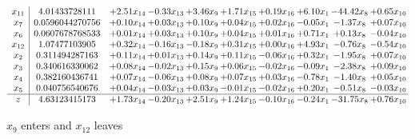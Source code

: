 \documentclass[9pt]{article}
\begin{document}
 \[\begin{array}{c| c c@{\hskip 2pt} c@{\hskip 2pt} c@{\hskip 2pt} c@{\hskip 2pt} c@{\hskip 2pt} c@{\hskip 2pt} c@{\hskip 2pt} c@{\hskip 2pt} }
 x_{11}   &  4.01433728111 & +  2.51 x_{14} & -0.33 x_{13} & +  3.46 x_{9} & +  1.71 x_{15} & +  0.19 x_{16} & +  6.10 x_{1} & -44.42 x_{8} & +  0.65 x_{10}\\
 x_{7}   &  0.0596044270756 & +  0.10 x_{14} & +  0.03 x_{13} & +  0.10 x_{9} & +  0.04 x_{15} & +  0.02 x_{16} & -0.05 x_{1} & -1.37 x_{8} & +  0.07 x_{10}\\
 x_{6}   &  0.0607678768533 & +  0.01 x_{14} & +  0.03 x_{13} & +  0.10 x_{9} & +  0.04 x_{15} & +  0.01 x_{16} & +  0.71 x_{1} & +  0.13 x_{8} & -0.04 x_{10}\\
 x_{12}   &  1.07477103905 & +  0.32 x_{14} & -0.16 x_{13} & -0.18 x_{9} & +  0.31 x_{15} & +  0.00 x_{16} & +  4.93 x_{1} & -0.76 x_{8} & -0.54 x_{10}\\
 x_{2}   &  0.311494287163 & +  0.11 x_{14} & +  0.01 x_{13} & +  0.14 x_{9} & +  0.11 x_{15} & -0.06 x_{16} & +  0.32 x_{1} & -1.95 x_{8} & +  0.07 x_{10}\\
 x_{3}   &  0.340616330062 & +  0.08 x_{14} & -0.02 x_{13} & +  0.15 x_{9} & +  0.06 x_{15} & -0.02 x_{16} & -0.09 x_{1} & -2.38 x_{8} & +  0.09 x_{10}\\
 x_{4}   &  0.382160436741 & +  0.07 x_{14} & -0.06 x_{13} & +  0.08 x_{9} & +  0.07 x_{15} & +  0.03 x_{16} & -0.78 x_{1} & -1.40 x_{8} & +  0.05 x_{10}\\
 x_{5}   &  0.040756540676 & +  0.04 x_{14} & -0.03 x_{13} & +  0.03 x_{9} & -0.01 x_{15} & -0.02 x_{16} & +  0.20 x_{1} & -0.51 x_{8} & -0.03 x_{10}\\
\hline
z    &  4.63123415173 & +  1.73 x_{14} & -0.20 x_{13} & +  2.51 x_{9} & +  1.24 x_{15} & -0.10 x_{16} & -0.24 x_{1} & -31.75 x_{8} & +  0.76 x_{10}\\
\end{array}\]


 $ x_{9} $ enters and $ x_{12} $ leaves 
\end{document}
